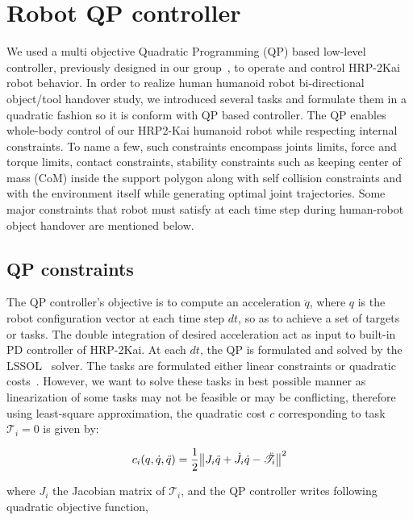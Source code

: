 
\section{Robot QP controller}\label{QPController}

We used a multi objective Quadratic Programming (QP) based low-level controller, previously designed in our group~\cite{ladder-HRP-2Kai}, to operate and control HRP-2Kai robot behavior. In order to realize human humanoid robot bi-directional object/tool handover study, we introduced several tasks and formulate them in a quadratic fashion so it is conform with QP based controller. The QP enables whole-body control of our HRP2-Kai humanoid robot while respecting internal constraints. To name a few, such constraints encompass joints limits, force and torque limits, contact constraints, stability constraints such as keeping center of mass (CoM) inside the support polygon along with self collision constraints and with the environment itself while generating optimal joint trajectories. Some major constraints that robot must satisfy at each time step during human-robot object handover are mentioned below.


\subsection{QP constraints}\label{QPConstraints}
The QP controller's objective is to compute an acceleration $\ddot{q}$, where $q$ is the robot configuration vector at each time step $dt$, so as to achieve a set of targets or tasks. The double integration of desired acceleration act as input to built-in PD controller of HRP-2Kai. At each $dt$, the QP is formulated and solved by the LSSOL~\cite{gill1986fortran} solver. The tasks are formulated either linear constraints or quadratic costs~\cite{ladder-HRP-2Kai, pfeiffer2017nut}. However, we want to solve these tasks in best possible manner as linearization of some tasks may not be feasible or may be conflicting, therefore using least-square approximation, the quadratic cost $c$ corresponding to task $\mathscr{T}_i =0$ is given by:

\begin{equation}
c_i(q,\dot{q}, \ddot{q})  = \frac{1}{2}{\norm{ J_i\ddot{q} + \dot{J}_i\dot{q} -\ddot{\mathscr{T}}_i }^2 }
\end{equation}

where $J_i$ the Jacobian matrix of $\mathscr{T}_i$, and the QP controller writes following quadratic objective function,

